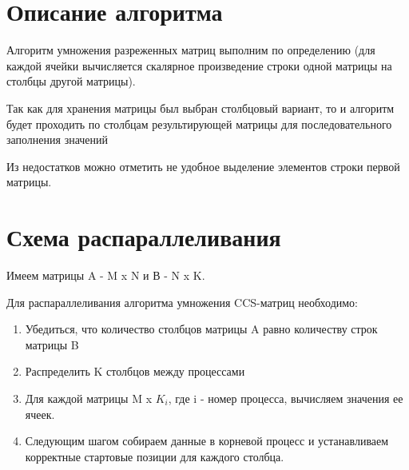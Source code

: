 \documentclass{report}
\begin{document}
\section*{Описание алгоритма}
\par Алгоритм умножения разреженных матриц выполним по определению (для каждой ячейки вычисляется скалярное произведение строки одной матрицы на столбцы другой матрицы). 
\par Так как для хранения матрицы был выбран столбцовый вариант, то и алгоритм будет проходить по столбцам результирующей матрицы для последовательного заполнения значений
\par Из недостатков можно отметить не удобное выделение элементов строки первой матрицы.

\newpage
\section*{Схема распараллеливания}
\par Имеем матрицы A - M x N и В - N x K. 
\par Для распараллеливания алгоритма умножения CCS-матриц необходимо:
\begin{enumerate}
\item Убедиться, что количество столбцов  матрицы A равно количеству строк матрицы B
\item Распределить K столбцов между процессами
\item Для каждой матрицы M x $K_i$, где i - номер процесса, вычисляем значения ее ячеек.
\item Следующим шагом собираем данные в корневой процесс и устанавливаем корректные стартовые позиции для каждого столбца.
\end{enumerate}
\newpage

\end{document}
